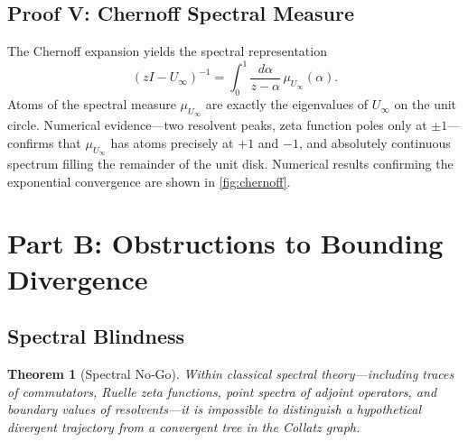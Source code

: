 \documentclass[12pt,a4paper]{article}
\newtheorem{theorem}{Theorem}[section]
\theoremstyle{definition}
\theoremstyle{remark}
\begin{document}
\subsection{Proof V: Chernoff Spectral Measure}

The Chernoff expansion yields the spectral representation
\[
(zI-U_\infty)^{-1}=\int_0^1\frac{d\alpha}{z-\alpha}\,\mu_{U_\infty}(\alpha).
\]
Atoms of the spectral measure $\mu_{U_\infty}$ are exactly the
eigenvalues of $U_\infty$ on the unit circle.
Numerical evidence---two resolvent peaks, zeta function poles only at
$\pm1$---confirms that $\mu_{U_\infty}$ has atoms precisely at $+1$
and $-1$, and absolutely continuous spectrum filling the remainder of
the unit disk.
Numerical results confirming the exponential convergence are shown in
\cref{fig:chernoff}.

\section{Part B: Obstructions to Bounding Divergence}

\subsection{Spectral Blindness}

\begin{theorem}[Spectral No‑Go]\label{thm:spectralnogo}
Within classical spectral theory---including traces of commutators,
Ruelle zeta functions, point spectra of adjoint operators, and boundary
values of resolvents---it is impossible to distinguish a hypothetical
divergent trajectory from a convergent tree in the Collatz graph.
\end{theorem}
\end{document}
